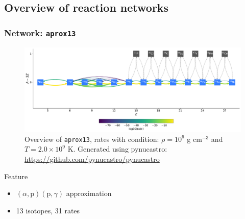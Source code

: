 \documentclass[
	11pt, %
]{beamer}
\begin{document}
\subsection{Overview of reaction networks}


\begin{frame}
\frametitle{Network: {\tt aprox13}}
        
    \begin{figure}
        \centering
        \includegraphics[width=1\linewidth]{aprox13.pdf}
        \caption{\scriptsize Overview of {\tt aprox13}, rates with condition: $\rho = 10^6$ g $\mathrm{cm}^{-3}$ and $T = 2.0 \times 10^9$ K. Generated using {\sf pynucastro}: \url {https://github.com/pynucastro/pynucastro}}
    \end{figure}
    \begin{block}{Feature}
        \begin{itemize}
            \item $(\alpha, \mbox{p})(\mbox{p}, \gamma)$ approximation
            \item 13 isotopes, 31 rates
        \end{itemize}
    \end{block}

\end{frame}
\end{document}
